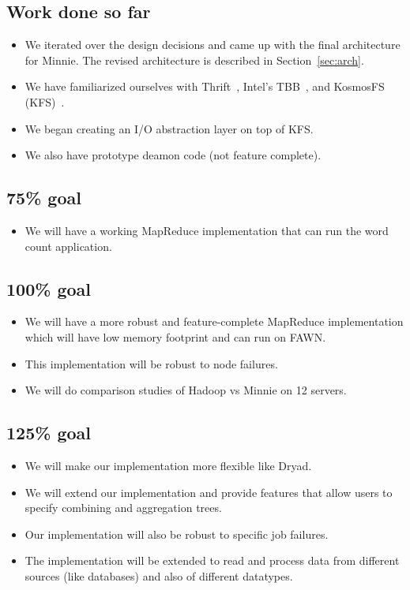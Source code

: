 \documentclass[10pt,letter,final,article,twocolumn]{article} %
\begin{document}
\subsection{Work done so far}
\begin{itemize}
\item We iterated over the design decisions and came up with the final architecture for Minnie. The revised architecture is described in Section~\ref{sec:arch}.
\item We have familiarized ourselves with Thrift~\citep{thrift10}, Intel's TBB~\citep{intel10}, and KosmosFS (KFS)~\citep{kfs10}. 
\item We began creating an I/O abstraction layer on top of KFS.
\item We also have prototype deamon code (not feature complete). 
\end{itemize}

\subsection{75\% goal}
\begin{itemize}
\item We will have a working MapReduce implementation that can run the word count application. 
\end{itemize}

\subsection{100\% goal}
\begin{itemize}
\item We will have a more robust and feature-complete MapReduce implementation which will have low memory footprint and can run on FAWN.
\item This implementation will be robust to node failures.
\item We will do comparison studies of Hadoop vs Minnie on 12 servers.
\end{itemize}

\subsection{125\% goal}
\begin{itemize}
\item We will make our implementation more flexible like Dryad.
\item We will extend our implementation and provide features that allow users to specify combining and aggregation trees.
\item Our implementation will also be robust to specific job failures.
\item The implementation will be extended to read and process data from different sources (like databases) and also of different datatypes.
\end{itemize}
\end{document}
